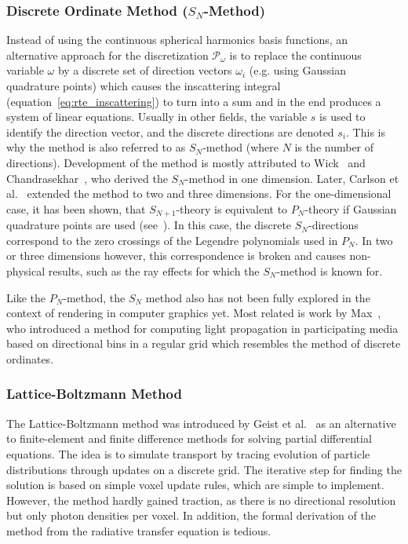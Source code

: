 \subsubsection*{Discrete Ordinate Method ($S_N$-Method)}
Instead of using the continuous spherical harmonics basis functions, an alternative approach for the discretization $\mathcal{P}_\omega$ is to replace the continuous variable $\omega$ by a discrete set of direction vectors $\omega_i$ (e.g. using Gaussian quadrature points) which causes the inscattering integral (equation~\ref{eq:rte_inscattering}) to turn into a sum and in the end produces a system of linear equations. Usually in other fields, the variable $s$ is used to identify the direction vector, and the discrete directions are denoted $s_i$. This is why the method is also referred to as $S_N$-method (where $N$ is the number of directions). Development of the method is mostly attributed to Wick~\cite{Wick43} and Chandrasekhar~\cite{Chandrasekhar60}, who derived the $S_N$-method in one dimension. Later, Carlson et al.~\cite{Carlson61} extended the method to two and three dimensions. For the one-dimensional case, it has been shown, that $S_{N+1}$-theory is equivalent to $P_N$-theory if Gaussian quadrature points are used (see~\cite{Cullen01}). In this case, the discrete $S_N$-directions correspond to the zero crossings of the Legendre polynomials used in $P_N$. In two or three dimensions however, this correspondence is broken and causes non-physical results, such as the ray effects for which the $S_N$-method is known for.

Like the $P_N$-method, the $S_N$ method also has not been fully explored in the context of rendering in computer graphics yet. Most related is work by Max~\cite{Max95}, who introduced a method for computing light propagation in participating media based on directional bins in a regular grid which resembles the method of discrete ordinates.


\subsubsection*{Lattice-Boltzmann Method}

The Lattice-Boltzmann method was introduced by Geist et al.~\cite{Geist04} as an alternative to finite-element and finite difference methods for solving partial differential equations. The idea is to simulate transport by tracing evolution of particle distributions through updates on a discrete grid. The iterative step for finding the solution is based on simple voxel update rules, which are simple to implement. However, the method hardly gained traction, as there is no directional resolution but only photon densities per voxel. In addition, the formal derivation of the method from the radiative transfer equation is tedious.

